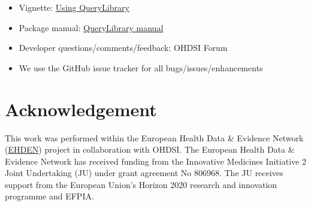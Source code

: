 \documentclass[]{article}
\providecommand{\tightlist}{%
  \setlength{\itemsep}{0pt}\setlength{\parskip}{0pt}}
\begin{document}
\begin{itemize}
\tightlist
\item
  Vignette:
  \href{https://github.com/OHDSI/QueryLibrary/blob/master/inst/doc/UsingQueryLibrary.pdf}{Using
  QueryLibrary}
\item
  Package manual:
  \href{https://github.com/OHDSI/QueryLibrary/blob/master/extras/QueryLibrary.pdf}{QueryLibrary
  manual}
\item
  Developer questions/comments/feedback: OHDSI Forum
\item
  We use the GitHub issue tracker for all bugs/issues/enhancements
\end{itemize}

\hypertarget{acknowledgement}{%
\section{Acknowledgement}\label{acknowledgement}}

This work was performed within the European Health Data \& Evidence
Network (\href{https://www.ehden.eu}{EHDEN}) project in collaboration
with OHDSI. The European Health Data \& Evidence Network has received
funding from the Innovative Medicines Initiative 2 Joint Undertaking
(JU) under grant agreement No 806968. The JU receives support from the
European Union's Horizon 2020 research and innovation programme and
EFPIA.
\end{document}
